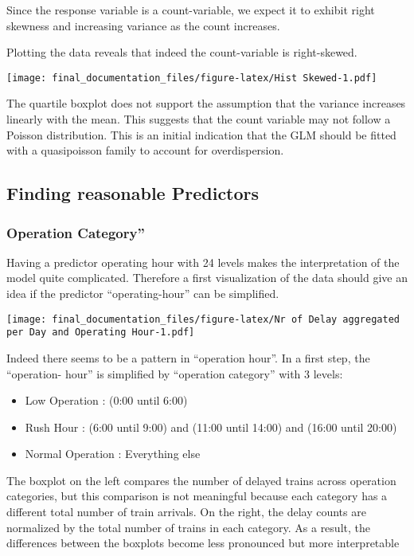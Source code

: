 \documentclass[
]{article}
\providecommand{\tightlist}{%
  \setlength{\itemsep}{0pt}\setlength{\parskip}{0pt}}
\begin{document}
Since the response variable is a count-variable, we expect it to exhibit
right skewness and increasing variance as the count increases.

Plotting the data reveals that indeed the count-variable is
right-skewed.

\texttt{[image: final\_documentation\_files/figure-latex/Hist Skewed-1.pdf]}

The quartile boxplot does not support the assumption that the variance
increases linearly with the mean. This suggests that the count variable
may not follow a Poisson distribution. This is an initial indication
that the GLM should be fitted with a quasipoisson family to account for
overdispersion.

\subsection{Finding reasonable
Predictors}\label{finding-reasonable-predictors}

\subsubsection{Operation Category''}\label{operation-category}

Having a predictor operating hour with 24 levels makes the
interpretation of the model quite complicated. Therefore a first
visualization of the data should give an idea if the predictor
``operating-hour'' can be simplified.

\texttt{[image: final\_documentation\_files/figure-latex/Nr of Delay aggregated per Day and Operating Hour-1.pdf]}

Indeed there seems to be a pattern in ``operation hour''. In a first
step, the ``operation- hour'' is simplified by ``operation category''
with 3 levels:

\begin{itemize}
\tightlist
\item
  Low Operation : (0:00 until 6:00)
\item
  Rush Hour : (6:00 until 9:00) and (11:00 until 14:00) and (16:00 until
  20:00)
\item
  Normal Operation : Everything else
\end{itemize}

The boxplot on the left compares the number of delayed trains across
operation categories, but this comparison is not meaningful because each
category has a different total number of train arrivals. On the right,
the delay counts are normalized by the total number of trains in each
category. As a result, the differences between the boxplots become less
pronounced but more interpretable
\end{document}
